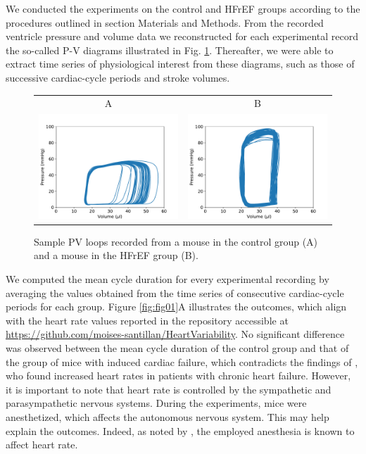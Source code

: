 \documentclass[%
preprint,
 amsmath,amssymb,
 aps,
]{revtex4-2}
\begin{document}
We conducted the experiments on the control and HFrEF groups according to the procedures outlined in section Materials and Methods. From the recorded ventricle pressure and volume data we reconstructed for each experimental record the so-called P-V diagrams illustrated in Fig. \ref{fig:PVLoops}. Thereafter, we were able to extract time series of physiological interest from these diagrams, such as those of successive cardiac-cycle periods and stroke volumes.

\begin{figure}[h!]
    \begin{tabular}{cc}
        A & B \\
        \includegraphics[width=3in]{PVLoops_A.pdf} &
        \includegraphics[width=3in]{PVLoops_B.pdf}
    \end{tabular}
    \caption{Sample PV loops recorded from a mouse in the control group (A) and a mouse in the HFrEF group (B).}
    \label{fig:PVLoops}
\end{figure}

We computed the mean cycle duration for every experimental recording by averaging the values obtained from the time series of consecutive cardiac-cycle periods for each group. Figure \ref{fig:fig01}A illustrates the outcomes, which align with the heart rate values reported in the repository accessible at \url{https://github.com/moises-santillan/HeartVariability}. No significant difference was observed between the mean cycle duration of the control group and that of the group of mice with induced cardiac failure, which contradicts the findings of \citet{Kamen_1995}, who found increased heart rates in patients with chronic heart failure. However, it is important to note that heart rate is controlled by the sympathetic and parasympathetic nervous systems. During the experiments, mice were anesthetized, which affects the autonomous nervous system. This may help explain the outcomes. Indeed, as noted by \citep{Nishiyama_2016, Kato_1992}, the employed anesthesia is known to affect heart rate.
\end{document}
